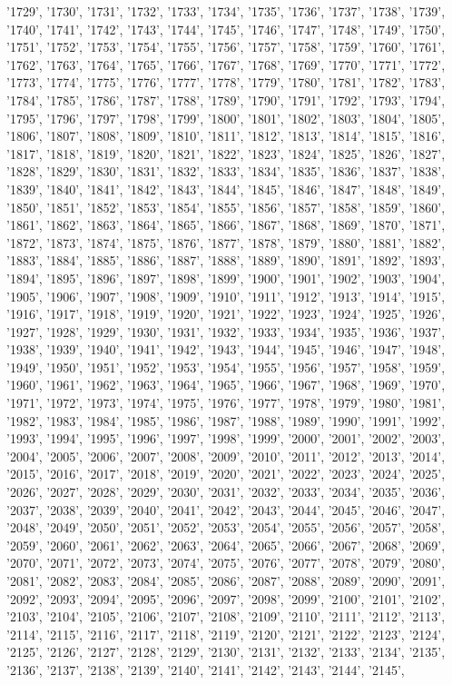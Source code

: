 '1729', '1730', '1731', '1732', '1733', '1734', '1735', '1736', '1737', '1738', '1739', '1740', '1741', '1742', '1743', '1744', '1745', '1746', '1747', '1748', '1749', '1750', '1751', '1752', '1753', '1754', '1755', '1756', '1757', '1758', '1759', '1760', '1761', '1762', '1763', '1764', '1765', '1766', '1767', '1768', '1769', '1770', '1771', '1772', '1773', '1774', '1775', '1776', '1777', '1778', '1779', '1780', '1781', '1782', '1783', '1784', '1785', '1786', '1787', '1788', '1789', '1790', '1791', '1792', '1793', '1794', '1795', '1796', '1797', '1798', '1799', '1800', '1801', '1802', '1803', '1804', '1805', '1806', '1807', '1808', '1809', '1810', '1811', '1812', '1813', '1814', '1815', '1816', '1817', '1818', '1819', '1820', '1821', '1822', '1823', '1824', '1825', '1826', '1827', '1828', '1829', '1830', '1831', '1832', '1833', '1834', '1835', '1836', '1837', '1838', '1839', '1840', '1841', '1842', '1843', '1844', '1845', '1846', '1847', '1848', '1849', '1850', '1851', '1852', '1853', '1854', '1855', '1856', '1857', '1858', '1859', '1860', '1861', '1862', '1863', '1864', '1865', '1866', '1867', '1868', '1869', '1870', '1871', '1872', '1873', '1874', '1875', '1876', '1877', '1878', '1879', '1880', '1881', '1882', '1883', '1884', '1885', '1886', '1887', '1888', '1889', '1890', '1891', '1892', '1893', '1894', '1895', '1896', '1897', '1898', '1899', '1900', '1901', '1902', '1903', '1904', '1905', '1906', '1907', '1908', '1909', '1910', '1911', '1912', '1913', '1914', '1915', '1916', '1917', '1918', '1919', '1920', '1921', '1922', '1923', '1924', '1925', '1926', '1927', '1928', '1929', '1930', '1931', '1932', '1933', '1934', '1935', '1936', '1937', '1938', '1939', '1940', '1941', '1942', '1943', '1944', '1945', '1946', '1947', '1948', '1949', '1950', '1951', '1952', '1953', '1954', '1955', '1956', '1957', '1958', '1959', '1960', '1961', '1962', '1963', '1964', '1965', '1966', '1967', '1968', '1969', '1970', '1971', '1972', '1973', '1974', '1975', '1976', '1977', '1978', '1979', '1980', '1981', '1982', '1983', '1984', '1985', '1986', '1987', '1988', '1989', '1990', '1991', '1992', '1993', '1994', '1995', '1996', '1997', '1998', '1999', '2000', '2001', '2002', '2003', '2004', '2005', '2006', '2007', '2008', '2009', '2010', '2011', '2012', '2013', '2014', '2015', '2016', '2017', '2018', '2019', '2020', '2021', '2022', '2023', '2024', '2025', '2026', '2027', '2028', '2029', '2030', '2031', '2032', '2033', '2034', '2035', '2036', '2037', '2038', '2039', '2040', '2041', '2042', '2043', '2044', '2045', '2046', '2047', '2048', '2049', '2050', '2051', '2052', '2053', '2054', '2055', '2056', '2057', '2058', '2059', '2060', '2061', '2062', '2063', '2064', '2065', '2066', '2067', '2068', '2069', '2070', '2071', '2072', '2073', '2074', '2075', '2076', '2077', '2078', '2079', '2080', '2081', '2082', '2083', '2084', '2085', '2086', '2087', '2088', '2089', '2090', '2091', '2092', '2093', '2094', '2095', '2096', '2097', '2098', '2099', '2100', '2101', '2102', '2103', '2104', '2105', '2106', '2107', '2108', '2109', '2110', '2111', '2112', '2113', '2114', '2115', '2116', '2117', '2118', '2119', '2120', '2121', '2122', '2123', '2124', '2125', '2126', '2127', '2128', '2129', '2130', '2131', '2132', '2133', '2134', '2135', '2136', '2137', '2138', '2139', '2140', '2141', '2142', '2143', '2144', '2145', 